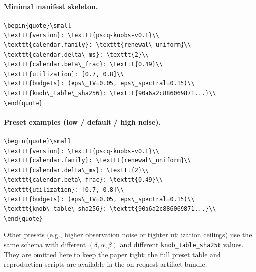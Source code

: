 \documentclass[11pt]{article}
\theoremstyle{definition}
\theoremstyle{remark}
\begin{document}
\paragraph{Minimal manifest skeleton.}
\begin{lstlisting}[basicstyle=\ttfamily\small]
\begin{quote}\small
\texttt{version}: \texttt{pscq-knobs-v0.1}\\
\texttt{calendar.family}: \texttt{renewal\_uniform}\\
\texttt{calendar.delta\_ms}: \texttt{2}\\
\texttt{calendar.beta\_frac}: \texttt{0.49}\\
\texttt{utilization}: [0.7, 0.8]\\
\texttt{budgets}: (eps\_TV=0.05, eps\_spectral=0.15)\\
\texttt{knob\_table\_sha256}: \texttt{90a6a2c886069871...}\\
\end{quote}
\end{lstlisting}

\paragraph{Preset examples (low / default / high noise).}
\begin{lstlisting}[basicstyle=\ttfamily\small]
\begin{quote}\small
\texttt{version}: \texttt{pscq-knobs-v0.1}\\
\texttt{calendar.family}: \texttt{renewal\_uniform}\\
\texttt{calendar.delta\_ms}: \texttt{2}\\
\texttt{calendar.beta\_frac}: \texttt{0.49}\\
\texttt{utilization}: [0.7, 0.8]\\
\texttt{budgets}: (eps\_TV=0.05, eps\_spectral=0.15)\\
\texttt{knob\_table\_sha256}: \texttt{90a6a2c886069871...}\\
\end{quote}
\end{lstlisting}


\smallskip
\noindent Other presets (e.g., higher observation noise or tighter utilization ceilings) use the same schema with different $(\delta,\alpha,\beta)$ and different \texttt{knob\_table\_sha256} values. They are omitted here to keep the paper tight; the full preset table and reproduction scripts are available in the on-request artifact bundle.
\end{document}
